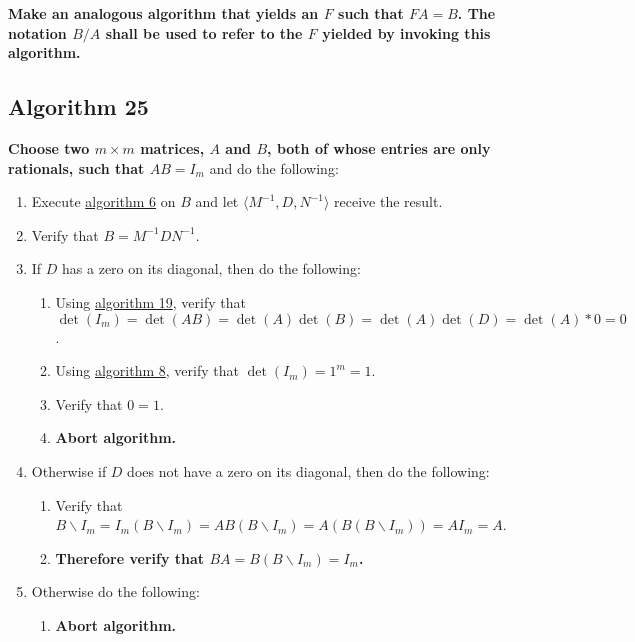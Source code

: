 \documentclass[twocolumn]{article}
\begin{document}
			\textbf{Make an analogous algorithm that yields an $F$ such that $FA=B$. The notation $B/A$ shall be used to refer to the $F$ yielded by invoking this algorithm.}
		\subsection{Algorithm 25}\label{sec:algorithm 25}
			\textbf{Choose two $m\times m$ matrices, $A$ and $B$, both of whose entries are only rationals, such that $AB=I_m$} and do the following:
			\begin{enumerate}
				\item Execute \hyperref[sec:algorithm 6]{algorithm 6} on $B$ and let $\langle M^{-1},D,N^{-1}\rangle$ receive the result.
				\item Verify that $B=M^{-1}DN^{-1}$.
				\item If $D$ has a zero on its diagonal, then do the following:
				\begin{enumerate}
					\item Using \hyperref[sec:algorithm 19]{algorithm 19}, verify that $\det(I_m)=\det(AB)=\det(A)\det(B)=\det(A)\det(D)=\det(A)*0=0$.
					\item Using \hyperref[sec:algorithm 8]{algorithm 8}, verify that $\det(I_m)=1^m=1$.
					\item Verify that $0=1$.
					\item \textbf{Abort algorithm.}
				\end{enumerate}
				\item Otherwise if $D$ does not have a zero on its diagonal, then do the following:
				\begin{enumerate}
					\item Verify that $B\backslash I_m=I_m(B\backslash I_m)=AB(B\backslash I_m)=A(B(B\backslash I_m))=AI_m=A$.
					\item \textbf{Therefore verify that $BA=B(B\backslash I_m)=I_m$.}
				\end{enumerate}
				\item Otherwise do the following:
				\begin{enumerate}
					\item \textbf{Abort algorithm.}
				\end{enumerate}
			\end{enumerate}
\end{document}
